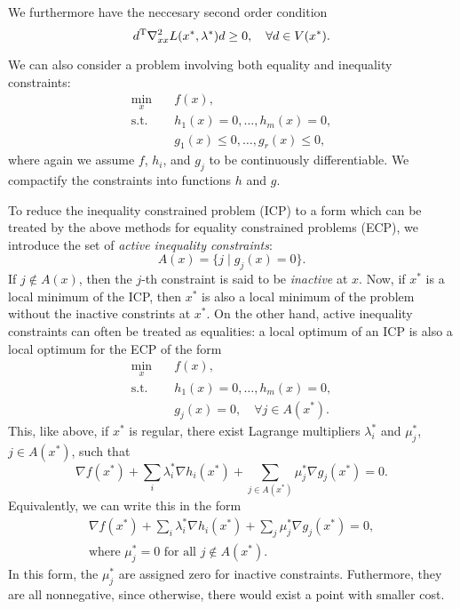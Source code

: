 \documentclass{article}
\begin{document}
We furthermore have the neccesary second order condition
\begin{equation*}
  d^{\mathrm{T}} \nabla^2_{xx} L(x^*, \lambda^*) d \geq 0, \quad\forall d \in V(x^*).
\end{equation*}


\label{s:lagrange-inequality}

We can also consider a problem involving both equality and inequality constraints:
\begin{align*}
  \min_x \quad &f(x), \\
  \text{s.t.} \quad &h_1(x) = 0, \dots, h_m(x) = 0, \\
               &g_1(x) \leq 0, \dots, g_r(x) \leq 0,
\end{align*}
where again we assume \(f\), \(h_i\), and \(g_j\) to be continuously differentiable.  We compactify
the constraints into functions \(h\) and \(g\).

To reduce the inequality constrained problem (ICP) to a form which can be treated by the above
methods for equality constrained problems (ECP), we introduce the set of \emph{active inequality
  constraints}:
\begin{equation*}
  A(x) = \{j \mid g_j(x) = 0\}.
\end{equation*}
If \(j \notin A(x)\), then the \(j\)-th constraint is said to be \emph{inactive} at \(x\).  Now, if
\(x^*\) is a local minimum of the ICP, then \(x^*\) is also a local minimum of the problem without
the inactive constrints at \(x^*\).  On the other hand, active inequality constraints can often be
treated as equalities: a local optimum of an ICP is also a local optimum for the ECP of the form
\begin{align*}
  \min_x \quad &f(x), \\
  \text{s.t.} \quad &h_1(x) = 0, \dots, h_m(x) = 0, \\
               &g_j(x) = 0, \quad\forall j \in A(x^*).
\end{align*}
This, like above, if \(x^*\) is regular, there exist Lagrange multipliers \(\lambda^*_i\) and
\(\mu^*_j\), \(j \in A(x^*)\), such that
\begin{equation*}
  \nabla f(x^*) + \sum_i \lambda^*_i \nabla h_i(x^*) + \sum_{j \in A(x^*)} \mu^*_j \nabla g_j(x^*) = 0.
\end{equation*}
Equivalently, we can write this in the form
\begin{gather*}
  \nabla f(x^*) + \sum_i \lambda^*_i \nabla h_i(x^*) + \sum_{j} \mu^*_j \nabla g_j(x^*) = 0, \\
  \text{where } \mu^*_j = 0 \text{ for all } j \notin A(x^*).
\end{gather*}
In this form, the \(\mu^*_j\) are assigned zero for inactive constraints.  Futhermore, they are all
nonnegative, since otherwise, there would exist a point with smaller cost.
\end{document}
